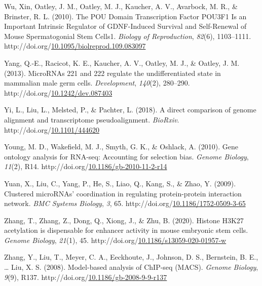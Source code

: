 \documentclass[12pt,twoside]{reedthesis}
\newlength{\cslhangindent}
\newenvironment{CSLReferences}[2] %
 {%
  \setlength{\parindent}{0pt}
  \ifodd #1 \everypar{\setlength{\hangindent}{\cslhangindent}}\ignorespaces\fi
  \ifnum #2 > 0
  \setlength{\parskip}{#2\baselineskip}
  \fi
 }%
 {}
\begin{document}
\begin{CSLReferences}{1}{0}
\leavevmode{}%
Wu, Xin, Oatley, J. M., Oatley, M. J., Kaucher, A. V., Avarbock, M. R., \& Brinster, R. L. (2010). The POU Domain Transcription Factor POU3F1 Is an Important Intrinsic Regulator of GDNF-Induced Survival and Self-Renewal of Mouse Spermatogonial Stem Cells1. \emph{Biology of Reproduction}, \emph{82}(6), 1103--1111. http://doi.org/\href{https://doi.org/10.1095/biolreprod.109.083097}{10.1095/biolreprod.109.083097}

\leavevmode{}%
Yang, Q.-E., Racicot, K. E., Kaucher, A. V., Oatley, M. J., \& Oatley, J. M. (2013). MicroRNAs 221 and 222 regulate the undifferentiated state in mammalian male germ cells. \emph{Development}, \emph{140}(2), 280--290. http://doi.org/\href{https://doi.org/10.1242/dev.087403}{10.1242/dev.087403}

\leavevmode{}%
Yi, L., Liu, L., Melsted, P., \& Pachter, L. (2018). A direct comparison of genome alignment and transcriptome pseudoalignment. \emph{BioRxiv}. http://doi.org/\href{https://doi.org/10.1101/444620}{10.1101/444620}

\leavevmode{}%
Young, M. D., Wakefield, M. J., Smyth, G. K., \& Oshlack, A. (2010). Gene ontology analysis for RNA-seq: Accounting for selection bias. \emph{Genome Biology}, \emph{11}(2), R14. http://doi.org/\href{https://doi.org/10.1186/gb-2010-11-2-r14}{10.1186/gb-2010-11-2-r14}

\leavevmode{}%
Yuan, X., Liu, C., Yang, P., He, S., Liao, Q., Kang, S., \& Zhao, Y. (2009). Clustered microRNAs' coordination in regulating protein-protein interaction network. \emph{BMC Systems Biology}, \emph{3}, 65. http://doi.org/\href{https://doi.org/10.1186/1752-0509-3-65}{10.1186/1752-0509-3-65}

\leavevmode{}%
Zhang, T., Zhang, Z., Dong, Q., Xiong, J., \& Zhu, B. (2020). Histone H3K27 acetylation is dispensable for enhancer activity in mouse embryonic stem cells. \emph{Genome Biology}, \emph{21}(1), 45. http://doi.org/\href{https://doi.org/10.1186/s13059-020-01957-w}{10.1186/s13059-020-01957-w}

\leavevmode{}%
Zhang, Y., Liu, T., Meyer, C. A., Eeckhoute, J., Johnson, D. S., Bernstein, B. E., \ldots{} Liu, X. S. (2008). Model-based analysis of ChIP-seq (MACS). \emph{Genome Biology}, \emph{9}(9), R137. http://doi.org/\href{https://doi.org/10.1186/gb-2008-9-9-r137}{10.1186/gb-2008-9-9-r137}


\end{CSLReferences}
\end{document}
